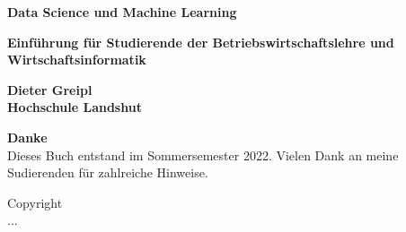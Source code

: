 
\begin{titlepage}

\begin{center}

\Huge \textbf{Data Science und Machine Learning}

\Large \textbf{Einführung für Studierende der Betriebswirtschaftslehre und Wirtschaftsinformatik}


\end{center}

\noindent{}

\vspace{-3cm}
\hfill
\begin{minipage}[b][1cm][t]{10cm}
  \color{white}
  \begin{flushright}
     \Huge\textbf{Dieter Greipl}\\
     \Large\textbf{Hochschule Landshut}\\
  \end{flushright}
\end{minipage}

\end{titlepage}

\begin{titlepage}
\hfill
\begin{minipage}[r][10cm][t]{10cm}
\large \textbf{Danke}\\
	Dieses Buch entstand im Sommersemester 2022. Vielen Dank an meine Sudierenden für zahlreiche Hinweise.
\end{minipage}

\vfill
\begin{minipage}[b][10cm][b]{10cm}
\large{Copyright}\\
	...
\end{minipage}

\end{titlepage}


